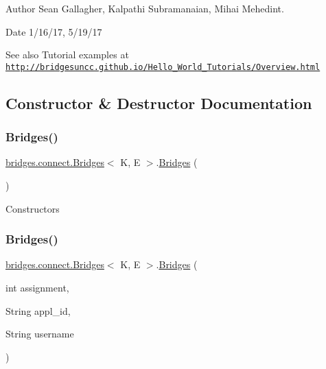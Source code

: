 \begin{DoxyAuthor}{Author}
Sean Gallagher, Kalpathi Subramanaian, Mihai Mehedint.
\end{DoxyAuthor}
\begin{DoxyDate}{Date}
1/16/17, 5/19/17
\end{DoxyDate}
\begin{DoxySeeAlso}{See also}
Tutorial examples at ~\newline
 \href{http://bridgesuncc.github.io/Hello_World_Tutorials/Overview.html}{\tt http\+://bridgesuncc.\+github.\+io/\+Hello\+\_\+\+World\+\_\+\+Tutorials/\+Overview.\+html} 
\end{DoxySeeAlso}


\subsection{Constructor \& Destructor Documentation}
\hypertarget{classbridges_1_1connect_1_1_bridges_a4925cf146eff9ff84e89351ab574795d}{}\label{classbridges_1_1connect_1_1_bridges_a4925cf146eff9ff84e89351ab574795d} 
\subsubsection{\texorpdfstring{Bridges()}{Bridges()}\hspace{0.1cm}{\footnotesize\ttfamily [1/2]}}
{\footnotesize\ttfamily \hyperlink{classbridges_1_1connect_1_1_bridges}{bridges.\+connect.\+Bridges}$<$ K, E $>$.\hyperlink{classbridges_1_1connect_1_1_bridges}{Bridges} (\begin{DoxyParamCaption}{ }\end{DoxyParamCaption})}

Constructors \hypertarget{classbridges_1_1connect_1_1_bridges_a297e7ca95c725fa20bce0768c2d9aa64}{}\label{classbridges_1_1connect_1_1_bridges_a297e7ca95c725fa20bce0768c2d9aa64} 
\subsubsection{\texorpdfstring{Bridges()}{Bridges()}\hspace{0.1cm}{\footnotesize\ttfamily [2/2]}}
{\footnotesize\ttfamily \hyperlink{classbridges_1_1connect_1_1_bridges}{bridges.\+connect.\+Bridges}$<$ K, E $>$.\hyperlink{classbridges_1_1connect_1_1_bridges}{Bridges} (\begin{DoxyParamCaption}\item[{int}]{assignment,  }\item[{String}]{appl\+\_\+id,  }\item[{String}]{username }\end{DoxyParamCaption})}


